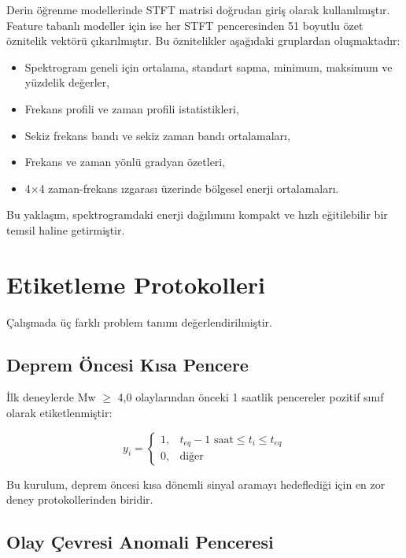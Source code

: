 Derin öğrenme modellerinde STFT matrisi doğrudan giriş olarak kullanılmıştır. Feature tabanlı modeller için ise her STFT penceresinden 51 boyutlu özet öznitelik vektörü çıkarılmıştır. Bu öznitelikler aşağıdaki gruplardan oluşmaktadır:

\begin{itemize}
    \item Spektrogram geneli için ortalama, standart sapma, minimum, maksimum ve yüzdelik değerler,
    \item Frekans profili ve zaman profili istatistikleri,
    \item Sekiz frekans bandı ve sekiz zaman bandı ortalamaları,
    \item Frekans ve zaman yönlü gradyan özetleri,
    \item 4$\times$4 zaman-frekans ızgarası üzerinde bölgesel enerji ortalamaları.
\end{itemize}

Bu yaklaşım, spektrogramdaki enerji dağılımını kompakt ve hızlı eğitilebilir bir temsil haline getirmiştir.

\section{Etiketleme Protokolleri}

Çalışmada üç farklı problem tanımı değerlendirilmiştir.

\subsection{Deprem Öncesi Kısa Pencere}

İlk deneylerde Mw $\geq$ 4,0 olaylarından önceki 1 saatlik pencereler pozitif sınıf olarak etiketlenmiştir:

\begin{equation}
y_i = \begin{cases}
1, & t_{eq} - 1\text{ saat} \leq t_i \leq t_{eq} \\
0, & \text{diğer}
\end{cases}
\end{equation}

Bu kurulum, deprem öncesi kısa dönemli sinyal aramayı hedeflediği için en zor deney protokollerinden biridir.

\subsection{Olay Çevresi Anomali Penceresi}

